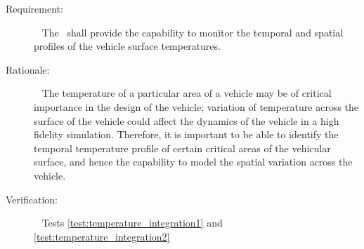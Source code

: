 
%
%
% 
%


\label{reqt:temp_monitoring}
\begin{description}
  \item[Requirement:]\ \newline
    The \ThermalRiderDesc\ shall provide the capability to monitor the temporal and spatial profiles of the vehicle surface temperatures. 
  \item[Rationale:]\ \newline
    The temperature of a particular area of a vehicle may be of critical importance in the design of the vehicle; variation of temperature across the surface of the vehicle could affect the dynamics of the vehicle in a high fidelity simulation.  Therefore, it is important to be able to identify the temporal temperature profile of certain critical areas of the vehicular surface, and hence the capability to model the spatial variation across the vehicle.
  \item[Verification:]\ \newline
	  Tests \vref{test:temperature_integration1} and \vref{test:temperature_integration2}
\end{description}

